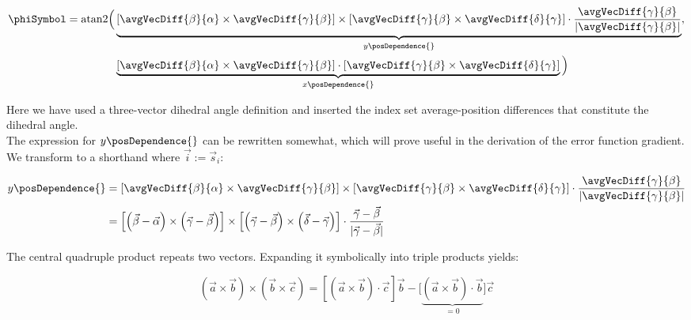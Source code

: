 \begin{align}\begin{aligned}
  \phiSymbol = \textrm{atan2} \Big( &
    \underbrace{
      \left[
        \avgVecDiff{\beta}{\alpha} \times \avgVecDiff{\gamma}{\beta}
      \right] \times \left[
        \avgVecDiff{\gamma}{\beta} \times \avgVecDiff{\delta}{\gamma}
      \right] \cdot \frac{
        \avgVecDiff{\gamma}{\beta}
      }{
        \lvert\avgVecDiff{\gamma}{\beta}\rvert
      }
    }_{y\posDependence{}},\\
    &\underbrace{
      \left[
        \avgVecDiff{\beta}{\alpha} \times \avgVecDiff{\gamma}{\beta}
      \right] \cdot \left[
        \avgVecDiff{\gamma}{\beta} \times \avgVecDiff{\delta}{\gamma}
      \right]
    }_{x\posDependence{}}
  \Big)
\end{aligned}\end{align}

Here we have used a three-vector dihedral angle definition and inserted the
index set average-position differences that constitute the dihedral angle.\\

The expression for $y\posDependence{}$ can be rewritten somewhat, which will
prove useful in the derivation of the error function gradient. We transform to a
shorthand where $\vec{i} := \vec{s}_{i}$:

\begin{align}
  y\posDependence{} &= 
    \left[
      \avgVecDiff{\beta}{\alpha} \times \avgVecDiff{\gamma}{\beta}
    \right] \times \left[
      \avgVecDiff{\gamma}{\beta} \times \avgVecDiff{\delta}{\gamma}
    \right] \cdot \frac{
      \avgVecDiff{\gamma}{\beta}
    }{
      \lvert\avgVecDiff{\gamma}{\beta}\rvert
    }\\
  &= 
    \left[
      \left(\vec{\beta} - \vec{\alpha}\right) 
      \times \left(\vec{\gamma} - \vec{\beta}\right)
    \right] \times \left[
      \left(\vec{\gamma} - \vec{\beta}\right)
      \times \left(\vec{\delta} - \vec{\gamma}\right)
    \right] \cdot \frac{
      \vec{\gamma} - \vec{\beta}
    }{
      \lvert\vec{\gamma} - \vec{\beta}\rvert
    }
\end{align}

The central quadruple product repeats two vectors. Expanding it symbolically
into triple products yields:

\begin{equation}
  \left(\vec{a} \times \vec{b}\right) \times \left(\vec{b} \times \vec{c}\right)
    = \left[\left(\vec{a} \times \vec{b}\right) \cdot \vec{c} \right] \vec{b}
      - \Big[\underbrace{\left(\vec{a} \times \vec{b}\right) \cdot
      \vec{b}}_{=0} \Big] \vec{c}
\end{equation}

